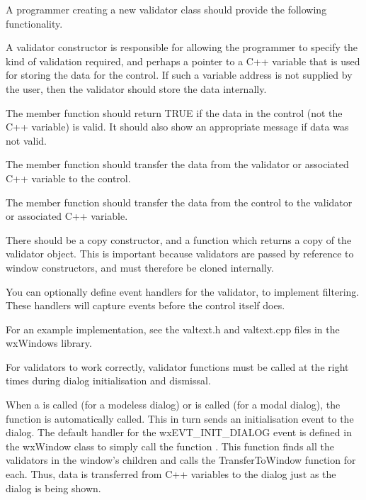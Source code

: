 
A programmer creating a new validator class should provide the following functionality.

A validator constructor is responsible for allowing the programmer to specify the kind
of validation required, and perhaps a pointer to a C++ variable that is used for storing the
data for the control. If such a variable address is not supplied by the user, then
the validator should store the data internally.

The  member function should return
TRUE if the data in the control (not the C++ variable) is valid. It should also show
an appropriate message if data was not valid.

The  member function should
transfer the data from the validator or associated C++ variable to the control.

The  member function should
transfer the data from the control to the validator or associated C++ variable.

There should be a copy constructor, and a  function
which returns a copy of the validator object. This is important because validators
are passed by reference to window constructors, and must therefore be cloned internally.

You can optionally define event handlers for the validator, to implement filtering. These handlers
will capture events before the control itself does.

For an example implementation, see the valtext.h and valtext.cpp files in the wxWindows library.


For validators to work correctly, validator functions must be called at the right times during
dialog initialisation and dismissal.

When a  is called (for a modeless dialog)
or  is called (for a modal dialog),
the function  is automatically called.
This in turn sends an initialisation event to the dialog. The default handler for
the wxEVT\_INIT\_DIALOG event is defined in the wxWindow class to simply call
the function . This
function finds all the validators in the window's children and calls the TransferToWindow
function for each. Thus, data is transferred from C++ variables to the dialog
just as the dialog is being shown.

